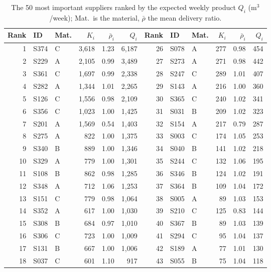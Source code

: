 \documentclass[11pt,a4paper]{article}
\begin{document}
\begin{table}[ht]
\centering
\caption{The 50 most important suppliers ranked by the expected weekly product $Q_i$ (m$^3$/week); Mat.\ is the material, $\bar\rho$ the mean delivery ratio.}\label{tab:top50}
\footnotesize
\setlength{\tabcolsep}{3pt}
\begin{tabular}{rllrrr@{\hspace{14pt}}rllrrr}
\toprule
Rank & ID & Mat. & $K_i$ & $\bar\rho_i$ & $Q_i$ & Rank & ID & Mat. & $K_i$ & $\bar\rho_i$ & $Q_i$ \\
\midrule
1 & S374 & C & 3{,}618 & 1.23 & 6{,}187 & 26 & S078 & A & 277 & 0.98 & 454 \\
2 & S229 & A & 2{,}105 & 0.99 & 3{,}489 & 27 & S273 & A & 271 & 0.98 & 442 \\
3 & S361 & C & 1{,}697 & 0.99 & 2{,}338 & 28 & S247 & C & 289 & 1.01 & 407 \\
4 & S282 & A & 1{,}344 & 1.01 & 2{,}265 & 29 & S143 & A & 216 & 1.00 & 360 \\
5 & S126 & C & 1{,}556 & 0.98 & 2{,}109 & 30 & S365 & C & 240 & 1.02 & 341 \\
6 & S356 & C & 1{,}023 & 1.00 & 1{,}425 & 31 & S031 & B & 209 & 1.02 & 323 \\
7 & S201 & A & 1{,}569 & 0.54 & 1{,}403 & 32 & S154 & A & 217 & 0.79 & 287 \\
8 & S275 & A & 822 & 1.00 & 1{,}375 & 33 & S003 & C & 174 & 1.05 & 253 \\
9 & S340 & B & 889 & 1.00 & 1{,}346 & 34 & S040 & B & 141 & 1.02 & 218 \\
10 & S329 & A & 779 & 1.00 & 1{,}301 & 35 & S244 & C & 132 & 1.06 & 195 \\
11 & S108 & B & 862 & 0.98 & 1{,}285 & 36 & S346 & B & 124 & 1.02 & 191 \\
12 & S348 & A & 712 & 1.06 & 1{,}253 & 37 & S364 & B & 109 & 1.04 & 172 \\
13 & S151 & C & 779 & 0.98 & 1{,}064 & 38 & S005 & A & 89 & 1.03 & 153 \\
14 & S352 & A & 617 & 1.00 & 1{,}030 & 39 & S210 & C & 125 & 0.83 & 144 \\
15 & S308 & B & 684 & 0.97 & 1{,}010 & 40 & S367 & B & 89 & 1.03 & 139 \\
16 & S306 & C & 723 & 1.00 & 1{,}009 & 41 & S294 & C & 95 & 1.04 & 137 \\
17 & S131 & B & 667 & 1.00 & 1{,}006 & 42 & S189 & A & 77 & 1.01 & 130 \\
18 & S037 & C & 601 & 1.10 & 917 & 43 & S055 & B & 75 & 1.04 & 118 \\

\end{tabular}
\end{table}
\end{document}
